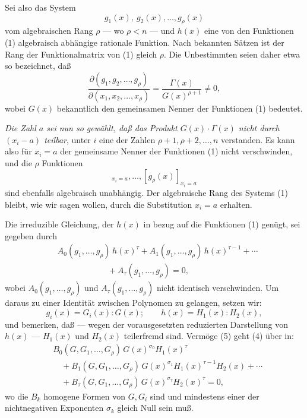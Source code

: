 \documentclass[11pt]{article}
\begin{document}
Sei also das System
\begin{equation}
  g_1(x),\ g_2(x),\ldots,g_\rho(x)
\tag{1}
\end{equation}
vom algebraischen Rang $\rho$ --- wo $\rho<n$ --- und $h(x)$ eine von den Funktionen (1) algebraisch abhängige rationale Funktion. Nach bekannten Sätzen ist der Rang der Funktionalmatrix von (1) gleich $\rho$. Die Unbestimmten seien daher etwa so bezeichnet, daß
\begin{equation}
 \frac{\partial(g_1,g_2,\ldots,g_\rho)}{\partial(x_1,x_2,\ldots,x_\rho)}
 =\frac{\Gamma(x)}{G(x)^{\rho+1}}\ne0,
\tag{2}
\end{equation}
wobei $G(x)$ bekanntlich den gemeinsamen Nenner der Funktionen (1) bedeutet.

\emph{Die Zahl $a$ sei nun so gewählt, daß das Produkt $G(x)\cdot\Gamma(x)$ nicht durch $(x_i-a)$ teilbar}, unter $i$ eine der Zahlen $\rho+1,\rho+2,\ldots,n$ verstanden. Es kann also für $x_i=a$ der gemeinsame Nenner der Funktionen (1) nicht verschwinden, und die $\rho$ Funktionen
\begin{equation}
  [g_1(x)]_{x_i=a},\ldots,[g_\rho(x)]_{x_i=a}
\tag{3}
\end{equation}
sind ebenfalls algebraisch unabhängig. Der algebraische Rang des Systems (1) bleibt, wie wir sagen wollen, durch die Substitution $x_i=a$ erhalten.

Die irreduzible Gleichung, der $h(x)$ in bezug auf die Funktionen (1) genügt, sei gegeben durch
\begin{equation}
\begin{aligned}
&A_0(g_1,\ldots,g_\rho)\,h(x)^\tau
 +A_1(g_1,\ldots,g_\rho)\,h(x)^{\tau-1}
 +\cdots \\
&\hspace{6em}+A_\tau(g_1,\ldots,g_\rho)=0,
\end{aligned}
\tag{4}
\end{equation}
wobei $A_0(g_1,
\ldots,g_\rho)$ und $A_\tau(g_1,\ldots,g_\rho)$ nicht identisch verschwinden. Um daraus zu einer Identität zwischen Polynomen zu gelangen, setzen wir:
\begin{equation}
  g_i(x)=G_i(x):G(x);\qquad h(x)=H_1(x):H_2(x),
\tag{5}
\end{equation}
und bemerken, daß --- wegen der vorausgesetzten reduzierten Darstellung von $h(x)$ --- $H_1(x)$ und $H_2(x)$ teilerfremd sind. Vermöge (5) geht (4) über in:
\begin{equation}
\begin{aligned}
&B_0(G,G_1,\ldots,G_\rho)\,G(x)^{\sigma_0}H_1(x)^\tau \\
&\quad+B_1(G,G_1,\ldots,G_\rho)\,G(x)^{\sigma_1}H_1(x)^{\tau-1}H_2(x)+\cdots \\
&\quad+B_\tau(G,G_1,\ldots,G_\rho)\,G(x)^{\sigma_\tau}H_2(x)^\tau=0,
\end{aligned}
\tag{6}
\end{equation}
wo die $B_k$ homogene Formen von $G,G_i$ sind und mindestens einer der nichtnegativen Exponenten $\sigma_k$ gleich Null sein muß.
\end{document}
